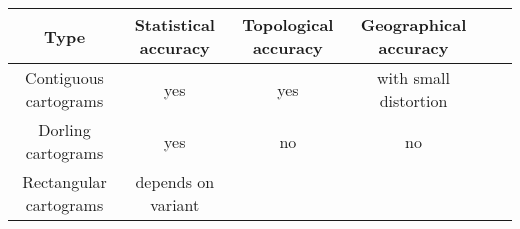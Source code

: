 \documentclass{egpubl}
\begin{document}
{
\begin{table*}[t]
\centering
\begin{tabular}{|c|c|c|c|c|c|}
\hline

\parbox{0.25\textwidth}{\centering \vspace{0.15cm}  \textbf{Type}

\vspace{0.15cm} } &

	\parbox{0.13\textwidth}{\centering \vspace{0.15cm} \textbf{Statistical accuracy}

\vspace{0.15cm} } &
	
	\parbox{0.13\textwidth}{\centering \vspace{0.15cm} \textbf{Topological accuracy}

\vspace{0.15cm} } &
	
	\parbox{0.13\textwidth}{\centering \vspace{0.15cm} \textbf{Geographical accuracy}}\\

\hline 


\parbox{0.25\textwidth}{\centering \vspace{0.15cm} Contiguous cartograms \cite{GN04}

\vspace{0.15cm}
} &
	\parbox{0.13\textwidth}{\centering yes} &
	\parbox{0.13\textwidth}{\centering yes} &
	\parbox{0.13\textwidth}{\centering  \vspace{0.15cm} with small distortion \vspace{0.15cm}} \\

\hline


\parbox{0.25\textwidth}{\centering \vspace{0.15cm}  Dorling cartograms \cite{dorling96}

\vspace{0.15cm} 
} &
	\parbox{0.13\textwidth}{\centering yes} &
	\parbox{0.13\textwidth}{\centering no} &
	\parbox{0.13\textwidth}{\centering  no} \\

\hline

\parbox{0.25\textwidth}{\centering \vspace{0.15cm} Rectangular cartograms \cite{ks07}

\vspace{0.15cm} 
} &

	\parbox{0.13\textwidth}{\centering \vspace{0.15cm} depends on variant \vspace{0.15cm}} &


\end{tabular}
\end{table*}}
\end{document}
